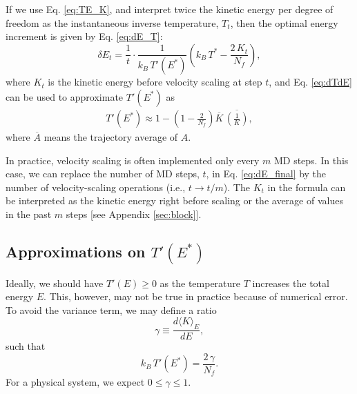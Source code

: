 \documentclass[reprint]{revtex4-1}
\begin{document}
If we use Eq. \eqref{eq:TE_K}, and
interpret twice the kinetic energy per degree of freedom
as the instantaneous inverse temperature,
$T_t$,
then the optimal energy increment is given by
Eq. \eqref{eq:dE_T}:
%
\begin{equation}
\delta E_t
=
\frac{ 1 } { t } \cdot
\frac{ 1 } { k_B \, T'(E^*) }
\left(
 k_B \, T^*
 -
 \frac{ 2 \, K_t } { N_f }
\right)
,
\label{eq:dE_final}
\end{equation}
%
where
$K_t$ is the kinetic energy before velocity scaling at step $t$,
and
Eq. \eqref{eq:dTdE} can be used to approximate
$T'(E^*)$ as
%
\begin{align}
  T'(E^*)
  \approx
  1
  -
  \left(
    1 - \frac{ 2 } { N_f }
  \right)
  \overline{ K }
  \,
  \overline{ \left( \frac 1 K \right) }
  ,
  \label{eq:dT}
\end{align}
%
where
$\overline A$ means the trajectory average of $A$.

In practice, velocity scaling is often implemented
only every $m$ MD steps.
%
In this case,
we can replace the number of MD steps, $t$,
in Eq. \eqref{eq:dE_final} by
the number of velocity-scaling operations
(i.e., $t \to t/m$).
%
The $K_t$ in the formula can be interpreted as
the kinetic energy right before scaling
or the average of values in the past $m$ steps
[see Appendix \ref{sec:block}].




\subsection{\label{sec:gamma}
Approximations on $T'(E^*)$}


Ideally, we should have $T'(E) \ge 0$
as the temperature $T$ increases the total energy $E$.
%
This, however, may not be true in practice
because of numerical error.
%
%
To avoid the variance term,
we may define a ratio
%
\begin{equation}
  \gamma
  \equiv
  \frac
  {
    d \langle K \rangle_E
  }
  {
    dE
  }
  ,
  \label{eq:gamma_def}
\end{equation}
%
such that
%
\begin{equation}
  k_B \, T'(E^*)
  =
  \frac{ 2 \, \gamma } { N_f }
  .
  \label{eq:dT_approx}
\end{equation}
%
For a physical system, we expect $0 \le \gamma \le 1$.
%
\end{document}
